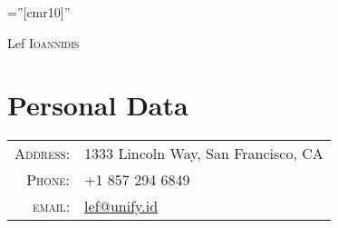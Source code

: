 \documentclass[lettersize,10pt]{article}
\begin{document}
\pagestyle{empty} %
\font\fb=''[cmr10]'' %

\par{\centering
		{\Huge Lef \textsc{Ioannidis}
	}\bigskip\par}

\section{Personal Data}

\begin{tabular}{rl}
    \textsc{Address:}   & 1333 Lincoln Way, San Francisco, CA \\
    \textsc{Phone:}     & +1 857 294 6849\\
    \textsc{email:}     & \href{mailto:lef@unify.id}{lef@unify.id}
\end{tabular}

\end{document}
